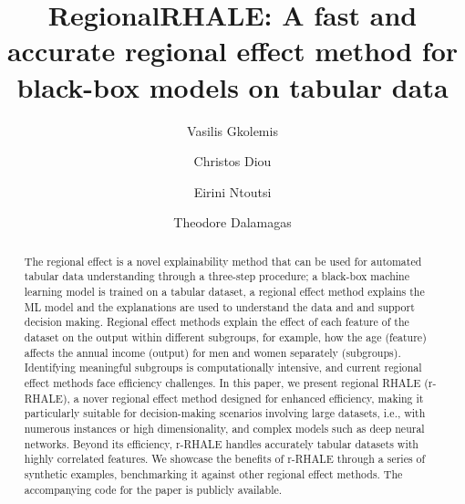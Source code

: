 \documentclass[
twocolumn,
]{ceurart}
\begin{document}


\title{RegionalRHALE: A fast and accurate regional effect method for black-box models on tabular data}

\author[1,2]{Vasilis Gkolemis}
\address[1]{Harokopio University of Athens}
\address[2]{ATHENA Research Center}
\author[1]{Christos Diou}
\author[3]{Eirini Ntoutsi}
\address[3]{University of the Bundeswehr Munich}
\author[2]{Theodore Dalamagas}


\begin{abstract}
  The regional effect is a novel explainability method that can be used for automated tabular data understanding through a three-step procedure; a black-box machine learning model is trained on a tabular dataset, a regional effect method explains the ML model and the explanations are used to understand the data and and support decision making.
  Regional effect methods explain the effect of each feature of the dataset on the output within different subgroups, for example, how the age (feature) affects the annual income (output) for men and women separately (subgroups). Identifying meaningful subgroups is computationally intensive, and current regional effect methods face efficiency challenges.
In this paper, we present regional RHALE (r-RHALE), a nover regional effect method designed for enhanced efficiency, making it particularly suitable for decision-making scenarios involving large datasets, i.e., with numerous instances or high dimensionality, and complex models such as deep neural networks. Beyond its efficiency, r-RHALE handles accurately tabular datasets with highly correlated features. We showcase the benefits of r-RHALE through a series of synthetic examples, benchmarking it against other regional effect methods. The accompanying code for the paper is publicly available.
\end{abstract}
\end{document}
